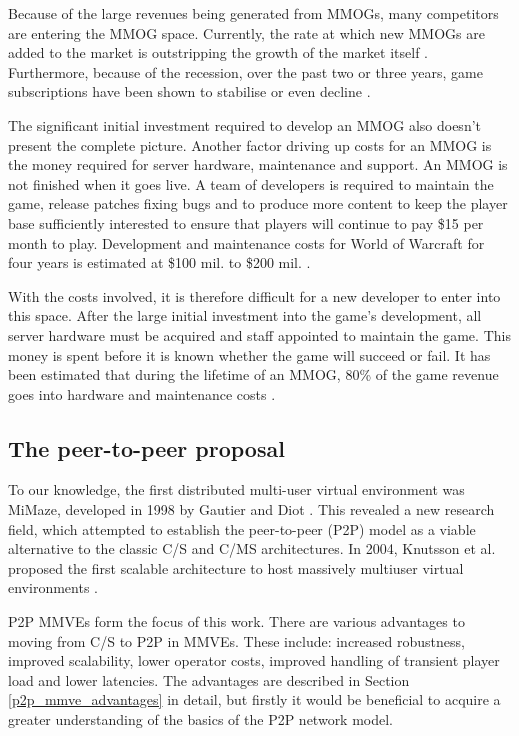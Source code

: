 Because of the large revenues being generated from MMOGs, many competitors are entering the MMOG space. Currently, the rate at which new MMOGs are added to the market is outstripping the growth of the market itself \cite{newzoo_mmo_report}. Furthermore, because of the recession, over the past two or three years, game subscriptions have been shown to stabilise or even decline \cite{mmo_growth_chart}.

The significant initial investment required to develop an MMOG also doesn't present the complete picture. Another factor driving up costs for an MMOG is the money required for server hardware, maintenance and support. An MMOG is not finished when it goes live. A team of developers is required to maintain the game, release patches fixing bugs and to produce more content to keep the player base sufficiently interested to ensure that players will continue to pay \$15 per month to play. Development and maintenance costs for World of Warcraft for four years is estimated at \$100 mil. to \$200 mil. \cite{wow_cost}.

With the costs involved, it is therefore difficult for a new developer to enter into this space. After the large initial investment into the game's development, all server hardware must be acquired and staff appointed to maintain the game. This money is spent before it is known whether the game will succeed or fail. It has been estimated that during the lifetime of an MMOG, 80\% of the game revenue goes into hardware and maintenance costs \cite{cs_mmog_cost}.

\subsection{The peer-to-peer proposal}

To our knowledge, the first distributed multi-user virtual environment was MiMaze, developed in 1998 by Gautier and Diot \cite{mimaze}. This revealed a new research field, which attempted to establish the peer-to-peer (P2P) model as a viable alternative to the classic C/S and C/MS architectures. In 2004, Knutsson et al. proposed the first scalable architecture to host massively multiuser virtual environments  \cite{knutsson_p2p_first}.

P2P MMVEs form the focus of this work. There are various advantages to moving from C/S to P2P in MMVEs. These include: increased robustness, improved scalability, lower operator costs, improved handling of transient player load and lower latencies. The advantages are described in Section \ref{p2p_mmve_advantages} in detail, but firstly it would be beneficial to acquire a greater understanding of the basics of the P2P network model.

